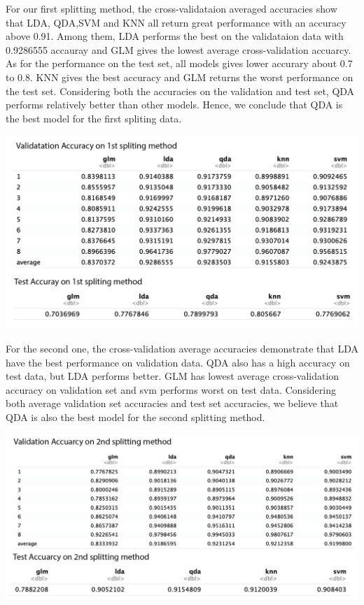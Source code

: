 \documentclass[11pt]{article}
\begin{document}
For our first splitting method, the cross-validataion averaged accuracies show that LDA, QDA,SVM and KNN all return great performance with an accuracy above 0.91. Among them, LDA performs the best on the validataion data with 0.9286555 accauray and GLM gives the lowest average cross-validation accuarcy. As for the performance on the test set, all models gives lower accurary about 0.7 to 0.8. KNN gives the best accuracy and GLM returns the worst performance on the test set. Considering both the accuracies on the validation and test set, QDA performs relatively better than other models. Hence, we conclude that QDA is the best model for the first spliting data.  

\includegraphics[width = 14.5cm]{3(a)1acuracy}

For the second one, the cross-validation average accuracies demonstrate that LDA have the best performance on validation data. QDA also has a high accuracy on test data, but LDA performs better. GLM has lowest average cross-validation accuracy on validation set and svm performs worst on test data. Considering both average validation set accuracies and test set accuracies, we believe that QDA is also the best model for the second splitting method.

\includegraphics[width = 15.5cm]{3(a)2acuracy}
\end{document}
